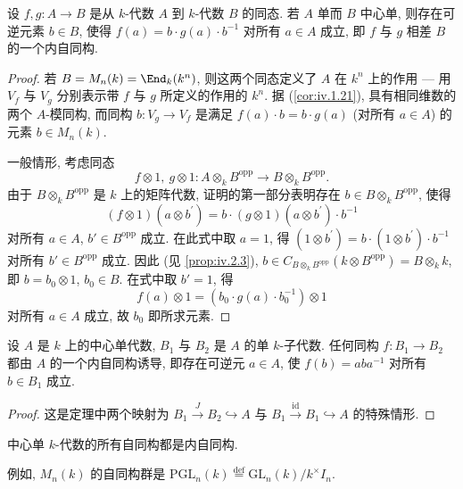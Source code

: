 \begin{theorem}\label{thm:iv.2.10}
设 $f,g\colon A\to B$ 是从 $k$-代数 $A$ 到 $k$-代数 $B$ 的同态. 若 $A$ 单而 $B$ 中心单, 则存在可逆元素 $b\in B$, 使得 $f(a)=b\cdot g(a)\cdot b^{-1}$ 对所有 $a\in A$ 成立, 即 $f$ 与 $g$ 相差 $B$ 的一个内自同构.
\end{theorem}

\begin{proof}
若 $B=M_n(k)=\End_k(k^n)$, 则这两个同态定义了 $A$ 在 $k^n$ 上的作用 — 用 $V_f$ 与 $V_g$ 分别表示带 $f$ 与 $g$ 所定义的作用的 $k^n$. 据 (\ref{cor:iv.1.21}), 具有相同维数的两个 $A$-模同构, 而同构 $b\colon V_g\to V_f$ 是满足 $f(a)\cdot b=b\cdot g(a)$ (对所有 $a\in A$) 的元素 $b\in M_n(k)$.

一般情形, 考虑同态
\[
f\otimes1,\ g\otimes1\colon A\otimes_{k}B^{\mathrm{opp}}\to B\otimes_{k}B^{\mathrm{opp}}.
\]
由于 $B\otimes_k B^{\mathrm{opp}}$ 是 $k$ 上的矩阵代数, 证明的第一部分表明存在 $b\in B\otimes_k B^{\mathrm{opp}}$, 使得
\[
(f\otimes1)(a\otimes b^{\prime})=b\cdot(g\otimes1)(a\otimes b^{\prime})\cdot b^{-1}
\]
对所有 $a\in A$, $b'\in B^{\mathrm{opp}}$ 成立. 在此式中取 $a=1$, 得 $(1\otimes b^{\prime})=b\cdot(1\otimes b^{\prime})\cdot b^{-1}$ 对所有 $b'\in B^{\mathrm{opp}}$ 成立. 因此 (见 \ref{prop:iv.2.3}), $b\in C_{B\otimes_k B^{\mathrm{opp}}}(k\otimes B^{\mathrm{opp}})=B\otimes_k k$, 即 $b=b_0\otimes 1$, $b_0\in B$. 在式中取 $b'=1$, 得
\[
f(a)\otimes1=(b_{0}\cdot g(a)\cdot b_{0}^{-1})\otimes1
\]
对所有 $a\in A$ 成立, 故 $b_0$ 即所求元素.
\end{proof}

\begin{corollary}\label{cor:iv.2.11}
设 $A$ 是 $k$ 上的中心单代数, $B_1$ 与 $B_2$ 是 $A$ 的单 $k$-子代数. 任何同构 $f\colon B_1\to B_2$ 都由 $A$ 的一个内自同构诱导, 即存在可逆元 $a\in A$, 使 $f(b)=aba^{-1}$ 对所有 $b\in B_1$ 成立.
\end{corollary}

\begin{proof}
这是定理中两个映射为 $B_1\xrightarrow{J}B_2\hookrightarrow A$ 与 $B_1\xrightarrow{\mathrm{id}}B_1\hookrightarrow A$ 的特殊情形.
\end{proof}

\begin{corollary}\label{cor:iv.2.12}
中心单 $k$-代数的所有自同构都是内自同构.

例如, $M_n(k)$ 的自同构群是 $\mathrm{PGL}_n(k)\stackrel{\mathrm{def}}{=}\mathrm{GL}_n(k)/k^{\times}I_n$.
\end{corollary}

